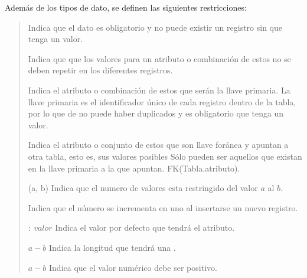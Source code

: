  Además de los tipos de dato, se definen las
 siguientes restricciones:

    \begin{quote}
    \begin{bGlosario}

            Indica que el dato es obligatorio y no puede existir un registro sin que tenga
            un valor.

            Indica que que los valores para un atributo o combinación de estos no se deben
            repetir en los diferentes registros.

            Indica el atributo o combinación de estos que serán la llave primaria. La llave
            primaria es el identificador único de cada registro dentro de la tabla, por lo
            que de no puede haber duplicados y es obligatorio que tenga un valor.

            Indica el atributo o conjunto de estos que son llave foránea y apuntan a otra
            tabla, esto es, sus valores posibles Sólo pueden ser aquellos que existan en la
            llave primaria a la que apuntan. FK(Tabla.atributo).

        (a, b)
            Indica que el numero de valores esta restringido del valor $a$ al $b$.

            Indica que el número se incrementa en uno al insertarse un nuevo registro.

         $:\ valor$
            Indica el valor por defecto que tendrá el atributo.

         $a-b$
            Indica la longitud que tendrá una .

         $a-b$
            Indica que el valor numérico debe ser positivo.
    \end{bGlosario}
    \end{quote}

\clearpage

\newcommand{\schemeName}[1]{%
    \vspace{-1em}\hfill Nombre en el esquema: {\it #1}\ \ \par%
}

    
    

